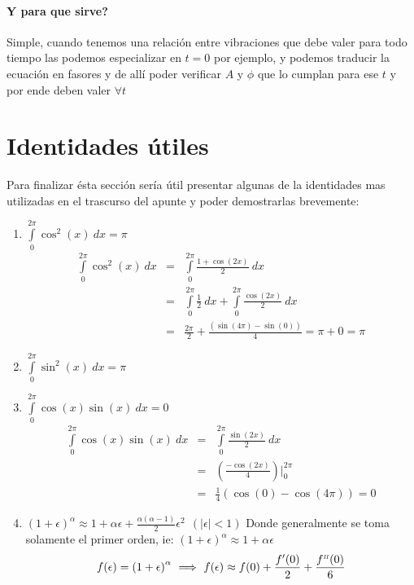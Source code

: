\documentclass[a4paper,spanish]{article}
\numberwithin{equation}{section}
\begin{document}
\paragraph{Y para que sirve?} Simple, cuando tenemos una relaci\'on entre vibraciones que debe valer para todo tiempo las podemos especializar en $t=0$ por ejemplo, y podemos traducir la ecuaci\'on en fasores y de all\'i poder verificar $A$ y $\phi$ que lo cumplan para ese $t$ y por ende deben valer $\forall t$

\section{Identidades \'utiles}

Para finalizar \'esta secci\'on ser\'ia \'util presentar algunas de la identidades mas utilizadas en el trascurso del apunte y poder demostrarlas brevemente:

\begin{enumerate}
\item $\int\limits_0^{2\pi}{\cos^2(x)} \ dx = \pi$
\[
\begin{array}{rcl}
\int\limits_0^{2\pi}{\cos^2(x)} \ dx & = &  \int\limits_0^{2\pi}{\frac{1+\cos(2x)}{2}} \ dx  \\
& = & \int\limits_0^{2\pi}{\frac{1}{2}} \ dx + \int\limits_0^{2\pi}{\frac{\cos(2x)}{2}} \ dx  \\
& = & \frac{2\pi}{2} + \frac{\left({\sin(4\pi)-\sin(0)}\right)}{4}  =  \pi + 0 = \pi  
\end{array}
\]
\item $\int\limits_0^{2\pi}{\sin^2(x)} \ dx = \pi$
\item $\int\limits_0^{2\pi}{\cos(x)\sin(x)} \ dx = 0$
\[
\begin{array}{rcl}
\int\limits_0^{2\pi}{\cos(x)\sin(x)} \ dx & = & \int\limits_0^{2\pi}{\frac{\sin(2x)}{2}} \ dx \\
& = & \left(\frac{-\cos(2x)}{4}\right)\vert_{0}^{2\pi} \\
& = & \frac{1}{4}\left(\cos(0)-\cos(4\pi)\right) = 0
\end{array}
\]
\item $\left(1+\epsilon\right)^{\alpha} \approx 1 + \alpha \epsilon + \frac{\alpha(\alpha - 1)}{2}\epsilon^2 \ \ (\vert \epsilon \vert < 1)$ Donde generalmente se toma solamente el primer orden, ie: $\left(1+\epsilon\right)^{\alpha} \approx 1 + \alpha \epsilon $
\[f(\epsilon)=\left(1+\epsilon\right)^{\alpha} \ \Longrightarrow \ f(\epsilon) \approx f(0) + \frac{f'(0)}{2} + \frac{f^{\mbox{\begin{tiny}{\textit{II}}\end{tiny}}}(0)}{6} \]
\end{enumerate}
\end{document}

